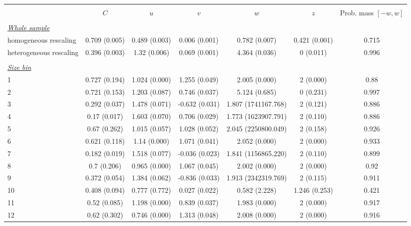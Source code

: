 
\begin{tabular}{@{\extracolsep{5pt}} l cccccc} 
\\[-1.8ex]\hline 
\hline \\[-1.8ex] 
 & $C$ & $u$ & $v$ & $w$ & $z$ & Prob. mass $[-w,w]$ \\ 
\hline \\[-1.8ex] 
\underline{{\it Whole sample}} &   &   &   &   &   &  \\ 
homogeneous rescaling & 0.709 (0.005) & 0.489 (0.003) & 0.006 (0.001) & 0.782 (0.007) & 0.421 (0.001) & 0.715 \\ 
heterogeneous rescaling & 0.396 (0.003) & 1.32 (0.006) & 0.069 (0.001) & 4.364 (0.036) & 0 (0.011) & 0.996 \\ 
 &   &   &   &   &   &  \\ 
\underline{{\it Size bin}} &   &   &   &   &   &  \\ 
1 & 0.727 (0.194) & 1.024 (0.000) & 1.255 (0.049) & 2.005 (0.000) & 2 (0.000) & 0.88 \\ 
2 & 0.721 (0.153) & 1.203 (0.087) & 0.746 (0.037) & 5.124 (0.685) & 0 (0.231) & 0.997 \\ 
3 & 0.292 (0.037) & 1.478 (0.071) & -0.632 (0.031) & 1.807 (1741167.768) & 2 (0.121) & 0.886 \\ 
4 & 0.17 (0.017) & 1.603 (0.070) & 0.706 (0.029) & 1.773 (1623907.791) & 2 (0.110) & 0.886 \\ 
5 & 0.67 (0.262) & 1.015 (0.057) & 1.028 (0.052) & 2.045 (2250800.049) & 2 (0.158) & 0.926 \\ 
6 & 0.621 (0.118) & 1.14 (0.000) & 1.071 (0.041) & 2.052 (0.000) & 2 (0.000) & 0.933 \\ 
7 & 0.182 (0.019) & 1.518 (0.077) & -0.036 (0.023) & 1.841 (1156865.220) & 2 (0.110) & 0.899 \\ 
8 & 0.7 (0.206) & 0.965 (0.000) & 1.067 (0.045) & 2.002 (0.000) & 2 (0.000) & 0.92 \\ 
9 & 0.372 (0.054) & 1.384 (0.062) & -0.836 (0.033) & 1.913 (2342319.769) & 2 (0.115) & 0.911 \\ 
10 & 0.408 (0.094) & 0.777 (0.772) & 0.027 (0.022) & 0.582 (2.228) & 1.246 (0.253) & 0.421 \\ 
11 & 0.52 (0.085) & 1.198 (0.000) & 0.839 (0.037) & 1.983 (0.000) & 2 (0.000) & 0.917 \\ 
12 & 0.62 (0.302) & 0.746 (0.000) & 1.313 (0.048) & 2.008 (0.000) & 2 (0.000) & 0.916 \\ 

\end{tabular}
